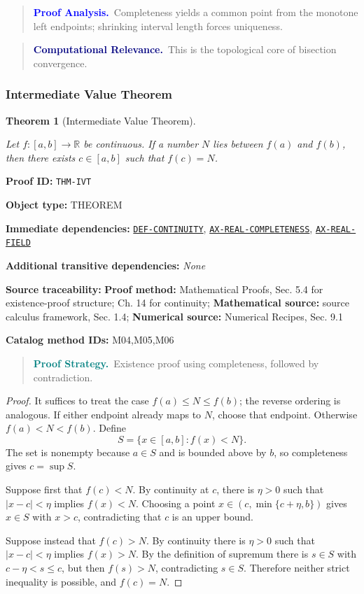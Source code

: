 \documentclass[10pt]{article}
\newcommand{\pidraw}[1]{\begingroup\urlstyle{tt}\nolinkurl{#1}\endgroup}
\newcommand{\pidref}[1]{\hyperref[prf:#1]{\pidraw{#1}}}
\newtheorem{theorem}{Theorem}[section]
\theoremstyle{definition}
\theoremstyle{remark}
\newenvironment{proofstrategy}
{\begin{quote}\small\noindent\textbf{\textcolor{teal}{Proof Strategy.}}\ }
{\end{quote}}
\newenvironment{proofanalysis}
{\begin{quote}\small\noindent\textbf{\textcolor{blue}{Proof Analysis.}}\ }
{\end{quote}}
\newenvironment{computationalrelevance}
{\begin{quote}\small\noindent\textbf{\textcolor{navy}{Computational Relevance.}}\ }
{\end{quote}}
\newcommand{\meta}[2]{\noindent\textbf{#1:} #2\par}
\begin{document}
\begin{proofanalysis}Completeness yields a common point from the monotone left endpoints; shrinking interval length forces uniqueness.\end{proofanalysis}

\begin{computationalrelevance}This is the topological core of bisection convergence.\end{computationalrelevance}

\subsubsection{Intermediate Value Theorem}

\begin{theorem}[Intermediate Value Theorem]\label{prf:THM-IVT}

Let $f:[a,b]\to\mathbb{R}$ be continuous. If a number $N$ lies between
$f(a)$ and $f(b)$, then there exists $c\in[a,b]$ such that $f(c)=N$.

\end{theorem}

\meta{Proof ID}{\pidraw{THM-IVT}}
\meta{Object type}{THEOREM}
\meta{Immediate dependencies}{\pidref{DEF-CONTINUITY}, \pidref{AX-REAL-COMPLETENESS}, \pidref{AX-REAL-FIELD}}
\meta{Additional transitive dependencies}{\emph{None}}
\meta{Source traceability}{\textbf{Proof method:} Mathematical Proofs, Sec. 5.4 for existence-proof structure; Ch. 14 for continuity; \textbf{Mathematical source:} source calculus framework, Sec. 1.4; \textbf{Numerical source:} Numerical Recipes, Sec. 9.1}
\meta{Catalog method IDs}{M04,M05,M06}

\begin{proofstrategy}Existence proof using completeness, followed by contradiction.\end{proofstrategy}

\begin{proof}

It suffices to treat the case $f(a)\le N\le f(b)$; the reverse ordering is analogous.
If either endpoint already maps to $N$, choose that endpoint. Otherwise
$f(a)<N<f(b)$. Define
\[
S=\{x\in[a,b]: f(x)<N\}.
\]
The set is nonempty because $a\in S$ and is bounded above by $b$, so completeness
gives $c=\sup S$.

Suppose first that $f(c)<N$. By continuity at $c$, there is $\eta>0$ such that
$|x-c|<\eta$ implies $f(x)<N$. Choosing a point
$x\in(c,\min\{c+\eta,b\})$ gives $x\in S$ with $x>c$, contradicting that $c$
is an upper bound.

Suppose instead that $f(c)>N$. By continuity there is $\eta>0$ such that
$|x-c|<\eta$ implies $f(x)>N$. By the definition of supremum there is
$s\in S$ with $c-\eta<s\le c$, but then $f(s)>N$, contradicting $s\in S$.
Therefore neither strict inequality is possible, and $f(c)=N$.

\end{proof}
\end{document}
